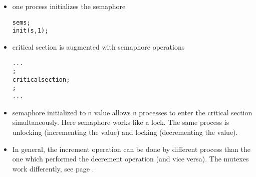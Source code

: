 
\begin{slide}
\begin{itemize}
\item one process initializes the semaphore
\begin{alltt}
sem s;
init(s, 1);
\end{alltt}
\item critical section is augmented with semaphore operations
\begin{alltt}
...
;
critical section;
;
...
\end{alltt}
\end{itemize}
\end{slide}


\begin{itemize}
\item semaphore initialized to \texttt{n} value allows \texttt{n} processes
to enter the critical section simultaneously. Here semaphore works like a lock.
The same process is unlocking (incrementing the value) and locking
(decrementing the value).
\item In general, the increment operation can be done by different process
than the one which performed the decrement operation (and vice versa).
The mutexes work differently, see page \pageref{MUTEXES}.
\end{itemize}



